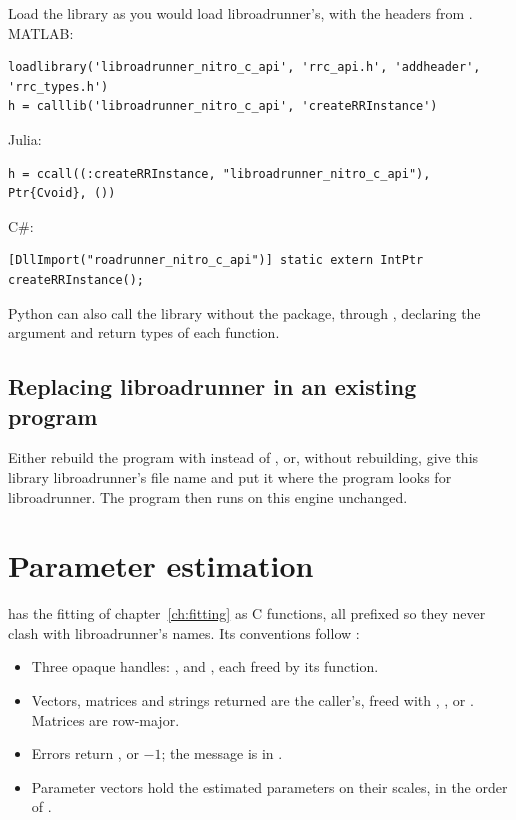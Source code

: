 Load the library as you would load libroadrunner's, with the headers from . MATLAB:

\begin{lstlisting}
loadlibrary('libroadrunner_nitro_c_api', 'rrc_api.h', 'addheader', 'rrc_types.h')
h = calllib('libroadrunner_nitro_c_api', 'createRRInstance')
\end{lstlisting}

Julia:

\begin{lstlisting}
h = ccall((:createRRInstance, "libroadrunner_nitro_c_api"), Ptr{Cvoid}, ())
\end{lstlisting}

C\#:

\begin{lstlisting}
[DllImport("roadrunner_nitro_c_api")] static extern IntPtr createRRInstance();
\end{lstlisting}

Python can also call the library without the package, through , declaring the argument and
return types of each function.

\subsection{Replacing libroadrunner in an existing program}

Either rebuild the program with  instead of , or,
without rebuilding, give this library libroadrunner's file name and put it where the program looks for
libroadrunner. The program then runs on this engine unchanged.

\section{Parameter estimation}

 has the fitting of chapter~\ref{ch:fitting} as C functions, all prefixed  so they
never clash with libroadrunner's names. Its conventions follow :

\begin{itemize}
  \item Three opaque handles: ,  and , each
        freed by its  function.
  \item Vectors, matrices and strings returned are the caller's, freed with ,
        ,  or . Matrices are row-major.
  \item Errors return ,  or $-1$; the message is in .
  \item Parameter vectors hold the estimated parameters on their scales, in the order of
        .
\end{itemize}

